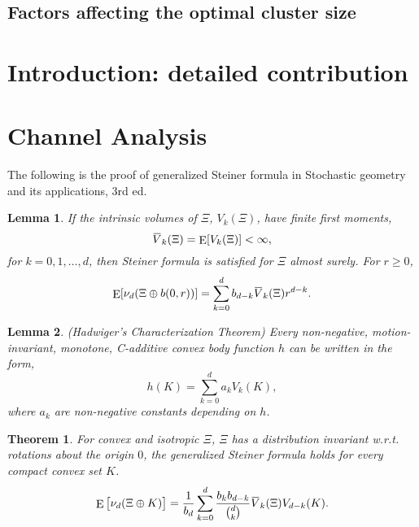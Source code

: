 \documentclass[10pt, conference, letterpaper]{IEEEtran}
\newtheorem{theorem}{Theorem}
\newtheorem{lemma}{Lemma}
\DeclareMathOperator*{\E}{\mathrm{E}}
\newcommand{\overbar}[1]{\mkern 1.5mu\overline{\mkern-1.5mu#1\mkern-1.5mu}\mkern 1.5mu}
\begin{document}
\subsection{Factors affecting the optimal cluster size}

\newpage
\section{Introduction: detailed contribution}

\section{Channel Analysis}
The following is the proof of generalized Steiner formula in Stochastic geometry and its applications, 3rd ed.
\begin{lemma}\label{lemma:steiner}
	If the intrinsic volumes of $\Xi$, $V_k(\Xi)$, have finite first moments,
	\begin{equation*}
	\overbar{V}_k(\Xi) = \E[V_k(\Xi)]<\infty,
	\end{equation*}
	for $k=0,1,\ldots, d$, then Steiner formula is satisfied for $\Xi$ almost surely. For $r\geq 0$, 
	\begin{equation}
	\E[\nu_d(\Xi \oplus b(0,r))] = \sum\limits_{k=0}^{d}b_{d-k}\overbar{V}_k(\Xi)r^{d-k}.
	\end{equation}
\end{lemma}
\begin{lemma}\label{lemma:characterization}
	(Hadwiger's Characterization Theorem) Every non-negative, motion-invariant, monotone, C-additive convex body function $h$ can be written in the form, 
	\begin{equation}\label{characterization}
	h(K) = \sum\limits_{k=0}^{d}a_kV_k(K),
	\end{equation}
	where $a_k$ are non-negative constants depending on $h$.
\end{lemma}
\begin{theorem}
	For convex and isotropic $\Xi$, $\Xi$ has a distribution invariant w.r.t. rotations about the origin $0$, the generalized Steiner formula holds for every compact convex set $K$. 
	\begin{equation}
	\E\big[\nu_d(\Xi\oplus K)\big] = \frac{1}{b_d}\sum\limits_{k=0}^{d}\frac{b_k b_{d-k}}{{d \choose k}}\overbar{V}_k(\Xi) V_{d-k}(K).
	\end{equation}
\end{theorem}
\end{document}

